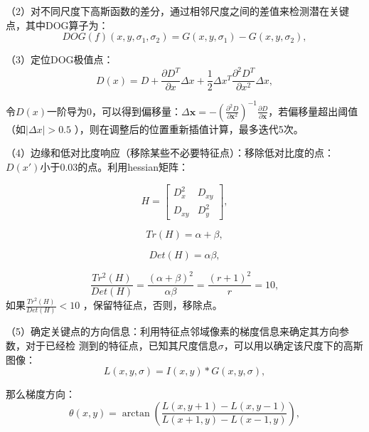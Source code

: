 （2）对不同尺度下高斯函数的差分，通过相邻尺度之间的差值来检测潜在关键点，其中DOG算子为：
\begin{equation}
	DOG(f)(x, y, \sigma_1, \sigma_2) = G(x, y, \sigma_1) - G(x, y, \sigma_2),
\end{equation}

（3）定位DOG极值点： 
\begin{equation}
	D(x) = D + \frac{\partial D^T}{\partial x} \Delta x + \frac{1}{2} \Delta x^T \frac{\partial^2 D^T}{\partial x^2} \Delta x,
\end{equation}

令\(D(x)\)一阶导为0，可以得到偏移量：\(\Delta \mathbf{x} = - \left( \frac{\partial^2 D}{\partial \mathbf{x}^2} \right)^{-1} \frac{\partial D}{\partial \mathbf{x}}\)，若偏移量超出阈值（如\(|\Delta x|>0.5\) ），则在调整后的位置重新插值计算，最多迭代5次。

（4）边缘和低对比度响应（移除某些不必要特征点）：移除低对比度的点：\(D(x')\)小于0.03的点。利用hessian矩阵：

\begin{equation}
	H = \begin{bmatrix}
		D_x^2 & D_{xy} \\
		D_{xy} & D_y^2
	\end{bmatrix},
\end{equation}

\begin{equation}
	Tr(H) = \alpha + \beta,
\end{equation}

\begin{equation}
	Det(H) = \alpha \beta,
\end{equation}

\begin{equation}
	\frac{Tr^{2}(H)}{Det(H)} = \frac{(\alpha + \beta)^{2}}{\alpha\beta} = \frac{(r + 1)^{2}}{r} = 10,
\end{equation}
如果\(\frac{Tr^{2}(H)}{Det(H)}<10\) ，保留特征点，否则，移除点。 

（5）确定关键点的方向信息：利用特征点邻域像素的梯度信息来确定其方向参数，对于已经检
测到的特征点，已知其尺度信息\(\sigma\)，可以用以确定该尺度下的高斯图像：
\begin{equation}
	L(x, y, \sigma) = I(x, y) * G(x, y, \sigma),
\end{equation}

那么梯度方向：
\begin{equation}
	\theta(x, y) = \arctan\left(\frac{L(x, y + 1) - L(x, y - 1)}{L(x + 1, y) - L(x - 1, y)}\right),
\end{equation}

